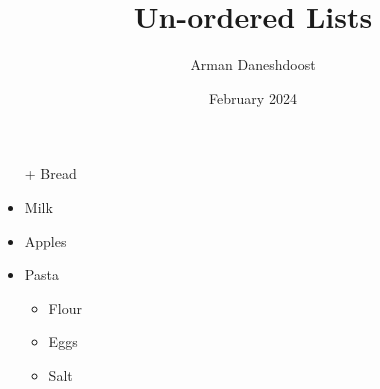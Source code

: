 \documentclass{article}
\title{Un-ordered Lists}
\author{Arman Daneshdoost}
\date{February 2024}
\begin{document}
	\maketitle
	\begin{itemize}
		\item[+] Bread %
		\item Milk
		\item Apples
		\item Pasta
		\begin{itemize}
			\item Flour
			\item Eggs
			\item Salt
		\end{itemize}
	\end{itemize}
\end{document}
